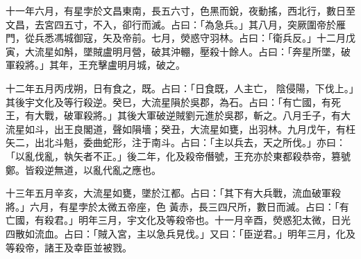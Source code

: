 \begin{pinyinscope}
 十一年六月，有星孛於文昌東南，長五六寸，色黑而銳，夜動搖，西北行，數日至文昌，去宮四五寸，不入，卻行而滅。占曰：「為急兵。」其八月，突厥圍帝於雁門，從兵悉馮城御寇，矢及帝前。七月，熒惑守羽林。占曰：「衛兵反。」十二月戊寅，大流星如斛，墜賊盧明月營，破其沖輣，壓殺十餘人。占曰：「奔星所墜，破軍殺將。」其年，王充擊盧明月城，破之。



 十二年五月丙戌朔，日有食之，既。占曰：「日食既，人主亡，
 陰侵陽，下伐上。」其後宇文化及等行殺逆。癸巳，大流星隕於吳郡，為石。占曰：「有亡國，有死王，有大戰，破軍殺將。」其後大軍破逆賊劉元進於吳郡，斬之。八月壬子，有大流星如斗，出王良閣道，聲如隕墻；癸丑，大流星如甕，出羽林。九月戊午，有枉矢二，出北斗魁，委曲蛇形，注于南斗。占曰：「主以兵去，天之所伐。」亦曰：「以亂伐亂，執矢者不正。」後二年，化及殺帝僭號，王充亦於東都殺恭帝，篡號鄭。皆殺逆無道，以亂代亂之應也。



 十三年五月辛亥，大流星如甕，墜於江都。占曰：「其下有大兵戰，流血破軍殺將。」六月，有星孛於太微五帝座，色
 黃赤，長三四尺所，數日而滅。占曰：「有亡國，有殺君。」明年三月，宇文化及等殺帝也。十一月辛酉，熒惑犯太微，日光四散如流血。占曰：「賊入宮，主以急兵見伐。」又曰：「臣逆君。」明年三月，化及等殺帝，諸王及幸臣並被戮。



\end{pinyinscope}